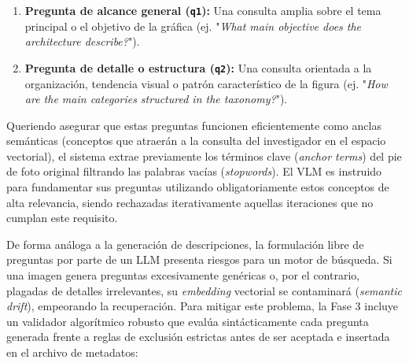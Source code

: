 \documentclass[a4paper]{report}
\begin{document}
\begin{enumerate}
    \item \textbf{Pregunta de alcance general (\texttt{q1}):} Una consulta amplia sobre el tema principal o el objetivo de la gráfica (ej. "\textit{What main objective does the architecture describe?}").
    \item \textbf{Pregunta de detalle o estructura (\texttt{q2}):} Una consulta orientada a la organización, tendencia visual o patrón característico de la figura (ej. "\textit{How are the main categories structured in the taxonomy?}").
\end{enumerate}

Queriendo asegurar que estas preguntas funcionen eficientemente como anclas semánticas (conceptos que atraerán a la consulta del investigador en el espacio vectorial), el sistema extrae previamente los términos clave (\textit{anchor terms}) del pie de foto original filtrando las palabras vacías (\textit{stopwords}). El VLM es instruido para fundamentar sus preguntas utilizando obligatoriamente estos conceptos de alta relevancia, siendo rechazadas iterativamente aquellas iteraciones que no cumplan este requisito.

De forma análoga a la generación de descripciones, la formulación libre de preguntas por parte de un LLM presenta riesgos para un motor de búsqueda. Si una imagen genera preguntas excesivamente genéricas o, por el contrario, plagadas de detalles irrelevantes, su \textit{embedding} vectorial se contaminará (\textit{semantic drift}), empeorando la recuperación. Para mitigar este problema, la Fase 3 incluye un validador algorítmico robusto que evalúa sintácticamente cada pregunta generada frente a reglas de exclusión estrictas antes de ser aceptada e insertada en el archivo de metadatos:
\end{document}

